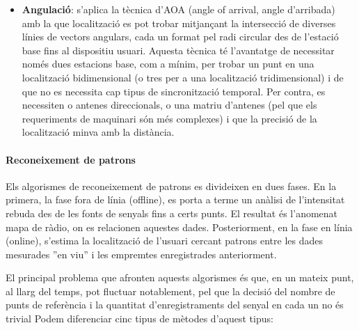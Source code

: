 \begin{itemize}
\begin{itemize}
    \end{itemize}

    \item \textbf{Angulació}: s’aplica la tècnica d’AOA (angle of arrival, angle d'arribada) amb la que localització es pot trobar mitjançant la intersecció de diverses línies de vectors angulars, cada un format pel radi circular des de l'estació base fins al dispositiu usuari. Aquesta tècnica té l'avantatge de necessitar només dues estacions base, com a mínim, per trobar un punt en una localització bidimensional (o tres per a una localització tridimensional) \cite{liu} i de que no es necessita cap tipus de sincronització temporal. Per contra, es necessiten o antenes direccionals, o una matriu d'antenes (pel que els requeriments de maquinari són més complexes) i que la precisió de la localització minva amb la distància.
    
\end{itemize}

\paragraph{Reconeixement de patrons}

Els algorismes de reconeixement de patrons es divideixen en dues fases. En la primera, la fase fora de línia (offline), es porta a terme un anàlisi de l'intensitat rebuda des de les fonts de senyals fins a certs punts. El resultat és l’anomenat mapa de ràdio, on es relacionen aquestes dades. Posteriorment, en la fase en línia (online), s'estima la localització de l'usuari cercant patrons entre les dades mesurades ''en viu'' i les empremtes enregistrades anteriorment.

El principal problema que afronten aquests algorismes és que, en un mateix punt, al llarg del temps, pot fluctuar notablement, pel que la decisió del nombre de punts de referència i la quantitat d'enregistraments del senyal en cada un no és trivial \cite{bagosi}
Podem diferenciar cinc tipus de mètodes d'aquest tipus:

